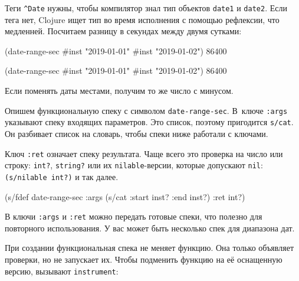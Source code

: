 \fi

Теги \verb|^Date| нужны, чтобы компилятор знал тип объектов \verb|date1| и
\verb|date2|. Если тега нет, Clojure ищет тип во время исполнения с помощью
рефлексии, что медленней. Посчитаем разницу в секундах между двумя сутками:

\ifx\DEVICETYPE\MOBILE

\begin{english}
  \begin{clojure}
(date-range-sec #inst "2019-01-01"
                #inst "2019-01-02")
86400
  \end{clojure}
\end{english}

\else

\begin{english}
  \begin{clojure}
(date-range-sec #inst "2019-01-01" #inst "2019-01-02")
86400
  \end{clojure}
\end{english}

\fi

\noindent
Если поменять даты местами, получим то же число с минусом.

Опишем функциональную спеку с символом \verb|date-range-sec|. В~ключе
\verb|:args| указывают спеку входящих параметров. Это список, поэтому пригодится
\verb|s/cat|. Он разбивает список на словарь, чтобы спеки ниже работали с
ключами.

Ключ \verb|:ret| означает спеку результата. Чаще всего это проверка на число или
строку: \verb|int?|, \verb|string?| или их \verb|nilable|-версии, которые
допускают \verb|nil|: \verb|(s/nilable int?)| и так далее.


\begin{english}
  \begin{clojure}
(s/fdef date-range-sec
  :args (s/cat :start inst? :end inst?)
  :ret int?)
  \end{clojure}
\end{english}

В ключи \verb|:args| и \verb|:ret| можно передать готовые спеки, что полезно
для повторного использования. У вас может быть несколько спек для диапазона дат.

При создании функциональная спека не меняет функцию. Она только объявляет
проверки, но не запускает их. Чтобы подменить функцию на её оснащенную версию,
вызывают \verb|instrument|:

\ifx\DEVICETYPE\MOBILE

